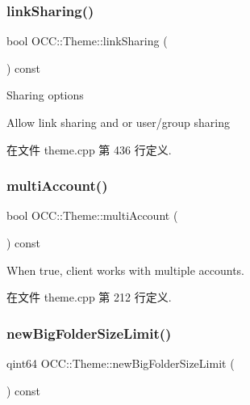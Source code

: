 \subsubsection{\texorpdfstring{link\+Sharing()}{linkSharing()}}
{\footnotesize\ttfamily bool O\+C\+C\+::\+Theme\+::link\+Sharing (\begin{DoxyParamCaption}{ }\end{DoxyParamCaption}) const\hspace{0.3cm}{\ttfamily [virtual]}}



Sharing options 

Allow link sharing and or user/group sharing 

在文件 theme.\+cpp 第 436 行定义.

\mbox{\label{class_o_c_c_1_1_theme_a1d9b3da46c44c4367c65053a5d143eab}} 
\subsubsection{\texorpdfstring{multi\+Account()}{multiAccount()}}
{\footnotesize\ttfamily bool O\+C\+C\+::\+Theme\+::multi\+Account (\begin{DoxyParamCaption}{ }\end{DoxyParamCaption}) const\hspace{0.3cm}{\ttfamily [virtual]}}

When true, client works with multiple accounts. 

在文件 theme.\+cpp 第 212 行定义.

\mbox{\label{class_o_c_c_1_1_theme_afcf3b20ca4685097b7ada76c6a7cf2ec}} 
\subsubsection{\texorpdfstring{new\+Big\+Folder\+Size\+Limit()}{newBigFolderSizeLimit()}}
{\footnotesize\ttfamily qint64 O\+C\+C\+::\+Theme\+::new\+Big\+Folder\+Size\+Limit (\begin{DoxyParamCaption}{ }\end{DoxyParamCaption}) const\hspace{0.3cm}{\ttfamily [virtual]}}

